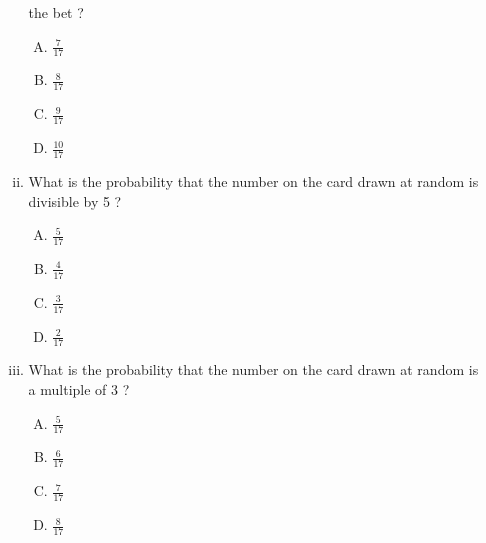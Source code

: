 \documentclass[12pt]{article}
\begin{document}
\begin{enumerate}
\begin{enumerate}[(i)]
the bet ?
\begin{enumerate}[(A)]
        \item $\frac{7}{17}$
        \item $\frac{8}{17}$
        \item $\frac{9}{17}$
        \item $\frac{10}{17}$
\end{enumerate}
      \item What is the probability that the number on the card drawn at random is 
divisible by 5 ?
\begin{enumerate}[(A)]
	\item $\frac{5}{17}$
        \item $\frac{4}{17}$
        \item $\frac{3}{17}$
        \item $\frac{2}{17}$
\end{enumerate}
      \item What is the probability that the number on the card drawn at random is a 
multiple of 3 ?
\begin{enumerate}[(A)]
        \item $\frac{5}{17}$
        \item $\frac{6}{17}$                                    \item $\frac{7}{17}$
	\item $\frac{8}{17}$
\end{enumerate}
\end{enumerate}
\end{enumerate}
\end{document}
